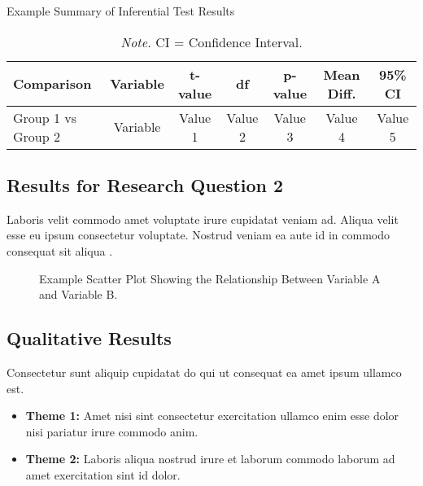 \begin{table}[ht]
  \centering
  \caption{Example Summary of Inferential Test Results}
  \label{tab:example_results}
  \begin{tabular}{lcccccc}
    \hline\hline
    \textbf{Comparison} & \textbf{Variable} & \textbf{t-value} & \textbf{df} & \textbf{p-value} & \textbf{Mean Diff.} & \textbf{95\% CI} \\
    \hline
    Group 1 vs Group 2 & Variable & Value 1 & Value 2 & Value 3 & Value 4 & Value 5 \\
    \hline\hline
  \end{tabular}
  \caption*{\textit{Note.} CI = Confidence Interval.}
\end{table}

\subsection{Results for Research Question 2}

Laboris velit commodo amet voluptate irure cupidatat veniam ad. Aliqua velit esse eu ipsum consectetur voluptate. Nostrud veniam ea aute id in commodo consequat sit aliqua \textcite{placeholderBook2023}.

\begin{figure}[ht]
  \centering

  \caption{Example Scatter Plot Showing the Relationship Between Variable A and Variable B.}
  \label{fig:example_results_plot}
\end{figure}

\subsection{Qualitative Results}
Consectetur sunt aliquip cupidatat do qui ut consequat ea amet ipsum ullamco est.
\begin{itemize}
  \item \textbf{Theme 1:} Amet nisi sint consectetur exercitation ullamco enim esse dolor nisi pariatur irure commodo anim.
  \item \textbf{Theme 2:} Laboris aliqua nostrud irure et laborum commodo laborum ad amet exercitation sint id dolor.
\end{itemize}

